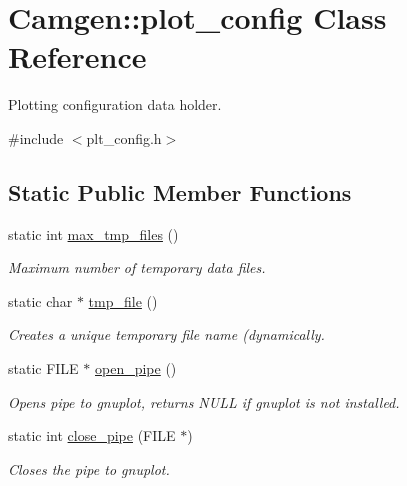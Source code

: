 \hypertarget{a00427}{}\section{Camgen\+:\+:plot\+\_\+config Class Reference}
\label{a00427}


Plotting configuration data holder.  




{\ttfamily \#include $<$plt\+\_\+config.\+h$>$}

\subsection*{Static Public Member Functions}
\begin{DoxyCompactItemize}
\item 
\hypertarget{a00427_a615c3c7b8bbecddcda4436a08dd4e301}{}static int \hyperlink{a00427_a615c3c7b8bbecddcda4436a08dd4e301}{max\+\_\+tmp\+\_\+files} ()\label{a00427_a615c3c7b8bbecddcda4436a08dd4e301}

\begin{DoxyCompactList}\small\item\em Maximum number of temporary data files. \end{DoxyCompactList}\item 
\hypertarget{a00427_a20dc2a981b98297089f04adc72d12c7e}{}static char $\ast$ \hyperlink{a00427_a20dc2a981b98297089f04adc72d12c7e}{tmp\+\_\+file} ()\label{a00427_a20dc2a981b98297089f04adc72d12c7e}

\begin{DoxyCompactList}\small\item\em Creates a unique temporary file name (dynamically. \end{DoxyCompactList}\item 
\hypertarget{a00427_af5aec1edd57c037a5573467c4c1a9a97}{}static F\+I\+L\+E $\ast$ \hyperlink{a00427_af5aec1edd57c037a5573467c4c1a9a97}{open\+\_\+pipe} ()\label{a00427_af5aec1edd57c037a5573467c4c1a9a97}

\begin{DoxyCompactList}\small\item\em Opens pipe to gnuplot, returns N\+U\+L\+L if gnuplot is not installed. \end{DoxyCompactList}\item 
\hypertarget{a00427_abb6c7f63db9af2c39be1e3bd317e4ef8}{}static int \hyperlink{a00427_abb6c7f63db9af2c39be1e3bd317e4ef8}{close\+\_\+pipe} (F\+I\+L\+E $\ast$)\label{a00427_abb6c7f63db9af2c39be1e3bd317e4ef8}

\begin{DoxyCompactList}\small\item\em Closes the pipe to gnuplot. \end{DoxyCompactList}\end{DoxyCompactItemize}
